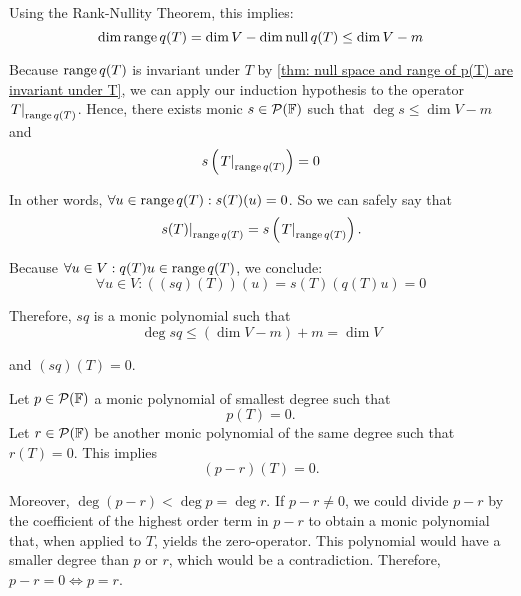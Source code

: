 \begin{prf}
  Using the Rank-Nullity Theorem, this implies:
  \begin{equation}
    \dim \operatorname{range} q(T)  = \dim V - \dim \operatorname{null} q(T) \leq \dim V - m
  \end{equation}

  Because $\operatorname{range} q(T)$ is invariant under $T$ by  \ref{thm: null space and range of p(T) are invariant under T}, we can apply our induction hypothesis to the operator $\left.T\right|_{\operatorname{range} q(T)}$.
  Hence, there exists monic $s \in \mathcal{P} (\mathbb{F})$ such that $\deg s \leq \dim V - m$ and
  \begin{equation}
    s\left(\left.T\right|_{\operatorname{range} q(T)}\right)=0
  \end{equation}

  In other words, $\forall u \in \operatorname{range} q(T): s(T)(u) = 0$. So we can safely say that
  \begin{equation}
    \left.s(T)\right|_{\operatorname{range} q(T)}=s\left( \left.T\right|_{\operatorname{range} q(T)} \right ).
  \end{equation}

  Because $\forall u \in V: q(T)u \in \operatorname{range} q(T)$, we conclude:
  \begin{equation}
     \forall u \in V: \left((sq)(T)\right)(u) = s(T) (q(T)u) = 0
  \end{equation}


  Therefore, $sq$ is a monic polynomial such that
  \begin{equation}
    \deg sq \leq (\dim V -m ) + m = \dim V
  \end{equation}

  and $(sq)(T)=0$.

   Let $p\in \mathcal{P} (\mathbb{F})$ a monic polynomial of smallest degree such that
  \begin{equation}
    p(T)=0.
  \end{equation} Let $r\in \mathcal{P} ( \mathbb{F})$ be another monic polynomial of the same degree such that $r(T)=0$. This implies
  \begin{equation}
    (p-r) (T) = 0.
  \end{equation}

  Moreover, $\deg (p-r) < \deg p = \deg r$. If $p-r \neq 0$, we could divide $p-r$ by the coefficient of the highest order term in $p-r$ to obtain a monic polynomial that, when applied to $T$, yields the zero-operator. This polynomial would have a smaller degree than $p$ or $r$, which would be a contradiction. Therefore, $p-r=0 \iff p = r$.
\end{prf}

